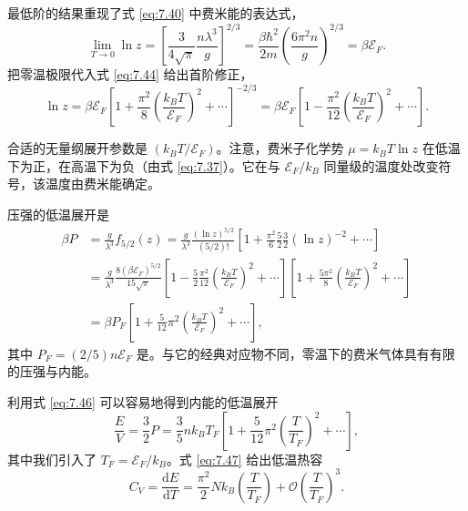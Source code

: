 

最低阶的结果重现了式 \eqref{eq:7.40} 中费米能的表达式，
\begin{equation*}
\lim_{T\to0}\ln z=\left[\frac3{4\sqrt\pi}\frac{n\lambda^3}g\right]^{2/3}=\frac{\beta\hbar^2}{2m}\left(\frac{6\pi^2n}g\right)^{2/3}=\beta\mathcal E_F.
\end{equation*}
把零温极限代入式 \eqref{eq:7.44} 给出首阶修正，
\begin{equation}\label{eq:7.45}
\ln z=\beta\mathcal E_F\left[1+\frac{\pi^2}8\left(\frac{k_BT}{\mathcal E_F}\right)^2+\cdots\right]^{-2/3}=\beta\mathcal E_F\left[1-\frac{\pi^2}{12}\left(\frac{k_BT}{\mathcal E_F}\right)^2+\cdots\right].
\end{equation}


合适的无量纲展开参数是 $(k_BT/\mathcal E_F)$。注意，费米子化学势 $\mu=k_BT\ln z$ 在低温下为正，在高温下为负（由式 \eqref{eq:7.37}）。它在与 $\mathcal E_F/k_B$ 同量级的温度处改变符号，该温度由费米能确定。

压强的低温展开是
\begin{equation}\label{eq:7.46}
\begin{aligned}
\beta P&=\frac g{\lambda^3}f_{5/2}(z)=\frac g{\lambda^3}\frac{(\ln z)^{5/2}}{(5/2)!}\left[1+\frac{\pi^2}6\frac52\frac32(\ln z)^{-2}+\cdots\right]\\
&=\frac g{\lambda^3}\frac{8(\beta\mathcal E_F)^{5/2}}{15\sqrt\pi}\left[1-\frac52\frac{\pi^2}{12}\left(\frac{k_BT}{\mathcal E_F}\right)^2+\cdots\right]\left[1+\frac{5\pi^2}8\left(\frac{k_BT}{\mathcal E_F}\right)^2+\cdots\right]\\
&=\beta P_F\left[1+\frac5{12}\pi^2\left(\frac{k_BT}{\mathcal E_F}\right)^2+\cdots\right],
\end{aligned}
\end{equation}
其中 $P_F=(2/5)n\mathcal E_F$ 是。与它的经典对应物不同，零温下的费米气体具有有限的压强与内能。



利用式 \eqref{eq:7.46} 可以容易地得到内能的低温展开
\begin{equation}\label{eq:7.47}
\frac EV=\frac32P=\frac35nk_BT_F\left[1+\frac5{12}\pi^2\left(\frac T{T_F}\right)^2+\cdots\right],
\end{equation}
其中我们引入了 $T_F=\mathcal E_F/k_B$。式 \eqref{eq:7.47} 给出低温热容
\begin{equation}\label{eq:7.48}
C_V=\frac{\mathrm dE}{\mathrm dT}=\frac{\pi^2}2Nk_B\left(\frac T{T_F}\right)+\mathcal O\left(\frac T{T_F}\right)^3.
\end{equation}

